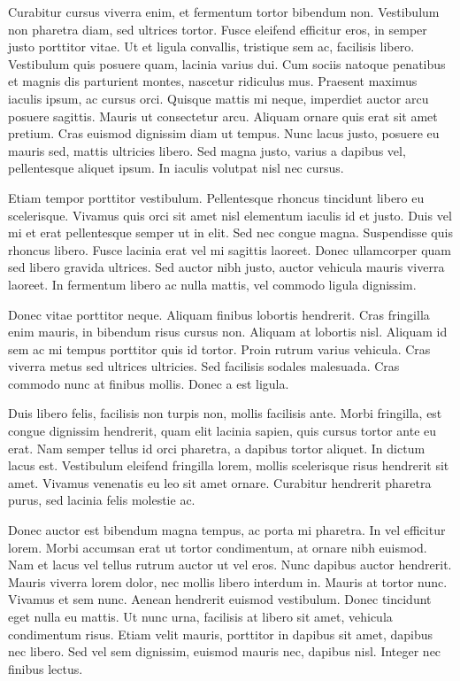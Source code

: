 Curabitur cursus viverra enim, et fermentum tortor bibendum non. Vestibulum
non pharetra diam, sed ultrices tortor. Fusce eleifend efficitur eros,
in semper justo porttitor vitae. Ut et ligula convallis, tristique
sem ac, facilisis libero. Vestibulum quis posuere quam, lacinia varius
dui. Cum sociis natoque penatibus et magnis dis parturient montes,
nascetur ridiculus mus. Praesent maximus iaculis ipsum, ac cursus
orci. Quisque mattis mi neque, imperdiet auctor arcu posuere sagittis.
Mauris ut consectetur arcu. Aliquam ornare quis erat sit amet pretium.
Cras euismod dignissim diam ut tempus. Nunc lacus justo, posuere eu
mauris sed, mattis ultricies libero. Sed magna justo, varius a dapibus
vel, pellentesque aliquet ipsum. In iaculis volutpat nisl nec cursus.

Etiam tempor porttitor vestibulum. Pellentesque rhoncus tincidunt
libero eu scelerisque. Vivamus quis orci sit amet nisl elementum iaculis
id et justo. Duis vel mi et erat pellentesque semper ut in elit. Sed
nec congue magna. Suspendisse quis rhoncus libero. Fusce lacinia erat
vel mi sagittis laoreet. Donec ullamcorper quam sed libero gravida
ultrices. Sed auctor nibh justo, auctor vehicula mauris viverra laoreet.
In fermentum libero ac nulla mattis, vel commodo ligula dignissim.

Donec vitae porttitor neque. Aliquam finibus lobortis hendrerit. Cras
fringilla enim mauris, in bibendum risus cursus non. Aliquam at lobortis
nisl. Aliquam id sem ac mi tempus porttitor quis id tortor. Proin
rutrum varius vehicula. Cras viverra metus sed ultrices ultricies.
Sed facilisis sodales malesuada. Cras commodo nunc at finibus mollis.
Donec a est ligula.

Duis libero felis, facilisis non turpis non, mollis facilisis ante.
Morbi fringilla, est congue dignissim hendrerit, quam elit lacinia
sapien, quis cursus tortor ante eu erat. Nam semper tellus id orci
pharetra, a dapibus tortor aliquet. In dictum lacus est. Vestibulum
eleifend fringilla lorem, mollis scelerisque risus hendrerit sit amet.
Vivamus venenatis eu leo sit amet ornare. Curabitur hendrerit pharetra
purus, sed lacinia felis molestie ac.

Donec auctor est bibendum magna tempus, ac porta mi pharetra. In vel
efficitur lorem. Morbi accumsan erat ut tortor condimentum, at ornare
nibh euismod. Nam et lacus vel tellus rutrum auctor ut vel eros. Nunc
dapibus auctor hendrerit. Mauris viverra lorem dolor, nec mollis libero
interdum in. Mauris at tortor nunc. Vivamus et sem nunc. Aenean hendrerit
euismod vestibulum. Donec tincidunt eget nulla eu mattis. Ut nunc
urna, facilisis at libero sit amet, vehicula condimentum risus. Etiam
velit mauris, porttitor in dapibus sit amet, dapibus nec libero. Sed
vel sem dignissim, euismod mauris nec, dapibus nisl. Integer nec finibus
lectus.

